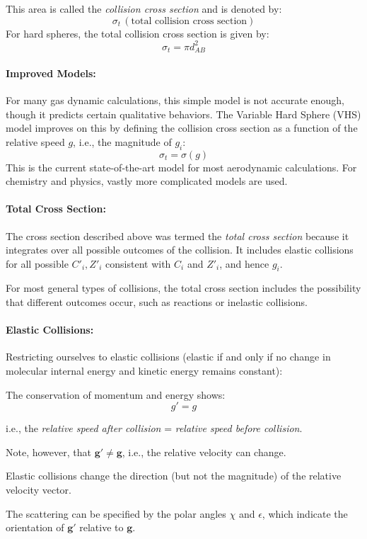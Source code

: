 \documentclass{article}
\begin{document}
This area is called the \textit{collision cross section} and is denoted by:
\[
\sigma_t \, (\text{total collision cross section})
\]
For hard spheres, the total collision cross section is given by:
\[
\sigma_t = \pi d_{AB}^2
\]

\paragraph{Improved Models:}
For many gas dynamic calculations, this simple model is not accurate enough, though it predicts certain qualitative behaviors. The Variable Hard Sphere (VHS) model improves on this by defining the collision cross section as a function of the relative speed \( g \), i.e., the magnitude of \( g_i \):
\[
\sigma_t = \sigma(g)
\]
This is the current state-of-the-art model for most aerodynamic calculations. For chemistry and physics, vastly more complicated models are used.

\paragraph{Total Cross Section:}
The cross section described above was termed the \textit{total cross section} because it integrates over all possible outcomes of the collision. It includes elastic collisions for all possible \( C'_i, Z'_i \) consistent with \( C_i \) and \( Z'_i \), and hence \( g_i \).

For most general types of collisions, the total cross section includes the possibility that different outcomes occur, such as reactions or inelastic collisions.

\paragraph{Elastic Collisions:}
Restricting ourselves to elastic collisions (elastic if and only if no change in molecular internal energy and kinetic energy remains constant):


The conservation of momentum and energy shows:
\[
g' = g
\]

i.e., the \textit{relative speed after collision} = \textit{relative speed before collision}. 

Note, however, that \( \mathbf{g}' \neq \mathbf{g} \), i.e., the relative velocity can change.

Elastic collisions change the direction (but not the magnitude) of the relative velocity vector.

The scattering can be specified by the polar angles \( \chi \) and \( \epsilon \), which indicate the orientation of \( \mathbf{g}' \) relative to \( \mathbf{g} \).
\end{document}
